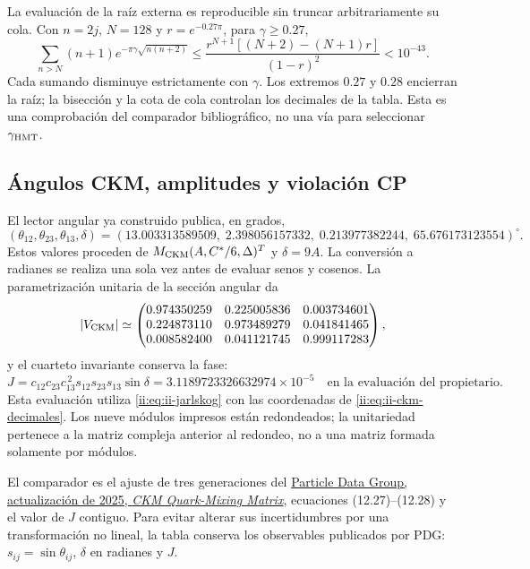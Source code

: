 La evaluación de la raíz externa es reproducible sin truncar
arbitrariamente su cola. Con \(n=2j\), \(N=128\) y
\(r=e^{-0.27\pi}\), para \(\gamma\geq0.27\),
\[
 \sum_{n>N}(n+1)e^{-\pi\gamma\sqrt{n(n+2)}}
 \leq \frac{r^{N+1}[(N+2)-(N+1)r]}{(1-r)^2}<10^{-43}.
\]
Cada sumando disminuye estrictamente con \(\gamma\). Los extremos
\(0.27\) y \(0.28\) encierran la raíz; la bisección y la cota de cola
controlan los decimales de la tabla. Esta es una comprobación del
comparador bibliográfico, no una vía para seleccionar \(\gamma_{\rm HMT}\).

\subsection{Ángulos CKM, amplitudes y violación CP}

El lector angular ya construido publica, en grados,
\begin{equation}
 (\theta_{12},\theta_{23},\theta_{13},\delta)
 =(13.003313589509,\;2.398056157332,\;
 0.213977382244,\;65.676173123554)^\circ.
 \label{ii:eq:ii-ckm-decimales}
\end{equation}
Estos valores proceden de \(M_{\rm CKM}(A,C^*/6,\Delta)^T\) y
\(\delta=9A\). La conversión a radianes se realiza una sola vez antes
de evaluar senos y cosenos. La parametrización unitaria de la sección
angular da
\[
 |V_{\rm CKM}|\simeq
 \begin{pmatrix}
 0.974350259&0.225005836&0.003734601\\
 0.224873110&0.973489279&0.041841465\\
 0.008582400&0.041121745&0.999117283
 \end{pmatrix},
\]
y el cuarteto invariante conserva la fase:
\[
 J=c_{12}c_{23}c_{13}^{\,2}s_{12}s_{23}s_{13}\sin\delta
 =3.1189723326632974\times10^{-5}\quad
 \text{en la evaluación del propietario.}
\]
Esta evaluación utiliza \eqref{ii:eq:ii-jarlskog} con las coordenadas de
\eqref{ii:eq:ii-ckm-decimales}. Los nueve módulos impresos están redondeados; la unitariedad pertenece
a la matriz compleja anterior al redondeo, no a una matriz formada
solamente por módulos.

El comparador es el ajuste de tres generaciones del
\href{https://pdg.lbl.gov/2025/reviews/rpp2025-rev-ckm-matrix.pdf}
{Particle Data Group, actualización de 2025, \emph{CKM Quark-Mixing Matrix}},
ecuaciones (12.27)--(12.28) y el valor de \(J\) contiguo. Para evitar
alterar sus incertidumbres por una transformación no lineal, la tabla
conserva los observables publicados por PDG: \(s_{ij}=\sin\theta_{ij}\),
\(\delta\) en radianes y \(J\).

